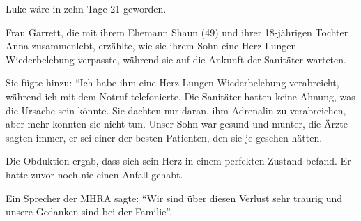 Luke wäre in zehn Tage 21 geworden.

Frau Garrett, die mit ihrem Ehemann Shaun (49) und ihrer 18-jährigen Tochter
Anna zusammenlebt, erzählte, wie sie ihrem Sohn eine Herz-Lungen-Wiederbelebung
verpasste, während sie auf die Ankunft der Sanitäter warteten.

Sie fügte hinzu: ``Ich habe ihm eine Herz-Lungen-Wiederbelebung verabreicht,
während ich mit dem Notruf telefonierte. Die Sanitäter hatten keine Ahnung, was
die Ursache sein könnte. Sie dachten nur daran, ihm Adrenalin zu verabreichen,
aber mehr konnten sie nicht tun. Unser Sohn war gesund und munter, die Ärzte
sagten immer, er sei einer der besten Patienten, den sie je gesehen hätten.

Die Obduktion ergab, dass sich sein Herz in einem perfekten Zustand befand. Er
hatte zuvor noch nie einen Anfall gehabt.

Ein Sprecher der MHRA sagte: ``Wir sind über diesen Verlust sehr traurig und
unsere Gedanken sind bei der Familie''.
